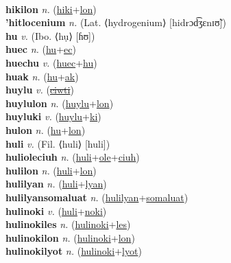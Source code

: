  \label{hikiles} \\
\textbf{hikilon} \textit{n.} (\hyperref[hiki]{hiki}+\hyperref[lon]{lon})
 \label{hikilon} \\
\textbf{'hitlocenium} \textit{n.} (Lat. ⟨hydrogenium⟩ [hidrɔd͡ʒɛnɪʊ̃])
 \label{'hitlocenium} \\
\textbf{hu} \textit{v.} (Ibo. ⟨hụ⟩ [ɦʊ])
 \label{hu} \\
\textbf{huec} \textit{n.} (\hyperref[hu]{hu}+\hyperref[ec]{ec})
 \label{huec} \\
\textbf{huechu} \textit{v.} (\hyperref[huec]{huec}+\hyperref[hu]{hu})
 \label{huechu} \\
\textbf{huak} \textit{n.} (\hyperref[hu]{hu}+\hyperref[ak]{ak})
 \label{huak} \\
\textbf{huylu} \textit{v.} (\hyperref[ciwti]{\sout{ciwti}})
 \label{huylu} \\
\textbf{huylulon} \textit{n.} (\hyperref[huylu]{huylu}+\hyperref[lon]{lon})
 \label{huylulon} \\
\textbf{huyluki} \textit{v.} (\hyperref[huylu]{huylu}+\hyperref[ki]{ki})
 \label{huyluki} \\
\textbf{hulon} \textit{n.} (\hyperref[hu]{hu}+\hyperref[lon]{lon})
 \label{hulon} \\
\textbf{huli} \textit{v.} (Fil. ⟨huli⟩ [huli])
 \label{huli} \\
\textbf{hulioleciuh} \textit{n.} (\hyperref[huli]{huli}+\hyperref[ole]{ole}+\hyperref[ciuh]{ciuh})
 \label{hulioleciuh} \\
\textbf{hulilon} \textit{n.} (\hyperref[huli]{huli}+\hyperref[lon]{lon})
 \label{hulilon} \\
\textbf{hulilyan} \textit{n.} (\hyperref[huli]{huli}+\hyperref[lyan]{lyan})
 \label{hulilyan} \\
\textbf{hulilyansomaluat} \textit{n.} (\hyperref[hulilyan]{hulilyan}+\hyperref[somaluat]{somaluat})
 \label{hulilyansomaluat} \\
\textbf{hulinoki} \textit{v.} (\hyperref[huli]{huli}+\hyperref[noki]{noki})
 \label{hulinoki} \\
\textbf{hulinokiles} \textit{n.} (\hyperref[hulinoki]{hulinoki}+\hyperref[les]{les})
 \label{hulinokiles} \\
\textbf{hulinokilon} \textit{n.} (\hyperref[hulinoki]{hulinoki}+\hyperref[lon]{lon})
 \label{hulinokilon} \\
\textbf{hulinokilyot} \textit{n.} (\hyperref[hulinoki]{hulinoki}+\hyperref[lyot]{lyot})
 \label{hulinokilyot} \\
